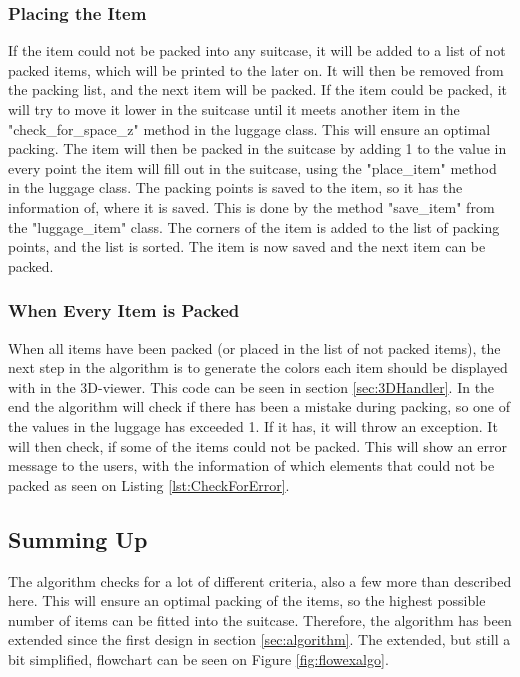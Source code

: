 \subsubsection{Placing the Item}
If the item could not be packed into any suitcase, it will be added to a list of not packed items, which will be printed to the  later on. It will then be removed from the packing list, and the next item will be packed. If the item could be packed, it will try to move it lower in the suitcase until it meets another item in the "check\_for\_space\_z" method in the luggage class. This will ensure an optimal packing. The item will then be packed in the suitcase by adding 1 to the value in every point the item will fill out in the suitcase, using the "place\_item" method in the luggage class. The packing points is saved to the item, so it has the information of, where it is saved. This is done by the method "save\_item" from the "luggage\_item" class. The corners of the item is added to the list of packing points, and the list is sorted. The item is now saved and the next item can be packed.

\subsubsection{When Every Item is Packed}
When all items have been packed (or placed in the list of not packed items), the next step in the algorithm is to generate the colors each item should be displayed with in the 3D-viewer. This code can be seen in section \ref{sec:3DHandler}.
In the end the algorithm will check if there has been a mistake during packing, so one of the values in the luggage has exceeded 1. If it has, it will throw an exception. It will then check, if some of the items could not be packed. This will show an error message to the users, with the information of which elements that could not be packed as seen on Listing \ref{lst:CheckForError}.

\subsection{Summing Up}
The algorithm checks for a lot of different criteria, also a few more than described here. This will ensure an optimal packing of the items, so the highest possible number of items can be fitted into the suitcase. Therefore, the algorithm has been extended since the first design in section \ref{sec:algorithm}. The extended, but still a bit simplified, flowchart can be seen on Figure \ref{fig:flowexalgo}.

